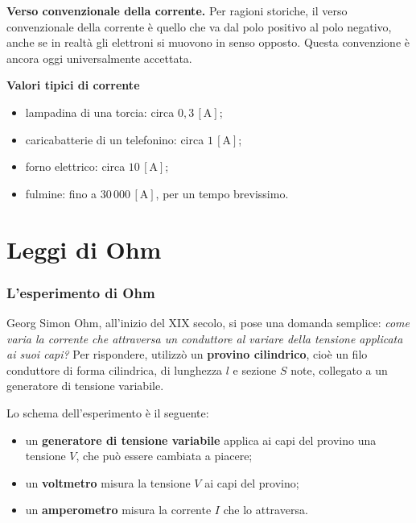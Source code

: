 \begin{concetto}
\textbf{Verso convenzionale della corrente.} Per ragioni storiche, il verso convenzionale della corrente è quello che va dal polo positivo al polo negativo, anche se in realtà gli elettroni si muovono in senso opposto. Questa convenzione è ancora oggi universalmente accettata.
\end{concetto}

\begin{esempio}
\textbf{Valori tipici di corrente}
\begin{itemize}[leftmargin=1cm]
  \item lampadina di una torcia: circa \(0{,}3\,[\text{A}]\);
  \item caricabatterie di un telefonino: circa \(1\,[\text{A}]\);
  \item forno elettrico: circa \(10\,[\text{A}]\);
  \item fulmine: fino a \(30\,000\,[\text{A}]\), per un tempo brevissimo.
\end{itemize}
\end{esempio}

\section{Leggi di Ohm}


\subsubsection{L'esperimento di Ohm}

Georg Simon Ohm, all'inizio del XIX secolo, si pose una domanda semplice: \emph{come varia la corrente che attraversa un conduttore al variare della tensione applicata ai suoi capi?} Per rispondere, utilizzò un \textbf{provino cilindrico}, cioè un filo conduttore di forma cilindrica, di lunghezza \(l\) e sezione \(S\) note, collegato a un generatore di tensione variabile.

Lo schema dell'esperimento è il seguente:
\begin{itemize}[leftmargin=1cm]
  \item un \textbf{generatore di tensione variabile} applica ai capi del provino una tensione \(V\), che può essere cambiata a piacere;
  \item un \textbf{voltmetro} misura la tensione \(V\) ai capi del provino;
  \item un \textbf{amperometro} misura la corrente \(I\) che lo attraversa.
\end{itemize}


